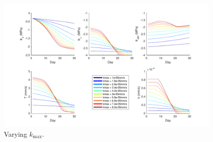 \documentclass[11pt]{article}
\begin{document}
\begin{figure}[h]
\centering
\includegraphics[width=35pc]{../figs/exp2}
\caption{Varying $k_\text{max}$.}
\label{fig:exp2}
\end{figure}





\clearpage

\nocite{*}


\end{document}

